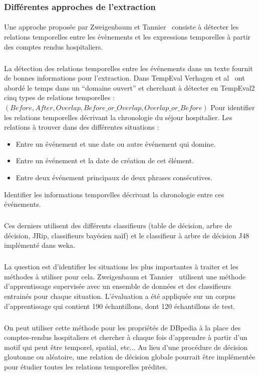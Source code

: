 \documentclass[12pt,a4]{report}
\begin{document}
\subsubsection{Différentes approches de l'extraction }
\paragraph{}
Une approche proposée par Zweigenbaum et Tannier~\cite{zweigenbaum2013} consiste à détecter les relations temporelles entre les évènements et les expressions temporelles à partir des comptes rendus hospitaliers.
\subparagraph{}
La détection des relations temporelles entre les événements dans un texte fournit de bonnes informations pour l’extraction.
\newline
Dans TempEval Verhagen et al~\cite{verhagen2010} ont abordé le temps dans un “domaine ouvert” et cherchant à détecter en TempEval2 cinq types de relations temporelles :
\newline
$(Before, After, Overlap, Before\_or\_Overlap, Overlap\_or\_Before)$
Pour identifier les relations temporelles décrivant la chronologie du séjour hospitalier.
\newline
Les relations à trouver dans des différentes situations :
\begin{itemize}
\item{}Entre un événement et une date ou autre événement qui domine.
\item{}Entre un événement et la date de création de cet élément.
\item{}Entre deux événement principaux de deux phrases consécutives.
\end{itemize}
Identifier les informations temporelles décrivant la chronologie entre ces événements.
\subparagraph{}
Ces derniers utilisent des différents classifieurs (table de décision, arbre de décision, JRip, classifieurs bayésien naïf) et le classifieur à arbre de décision J48 implémenté dans weka.
\subparagraph{}
La question est d’identifier les situations les plus importantes à traiter et les méthodes à utiliser pour cela.
Zweigenbaum et Tannier~\cite{zweigenbaum2013} utilisent une méthode d’apprentissage supervisée avec un ensemble de données et des classifieurs entrainés pour chaque situation.
L'évaluation a été appliquée sur un corpus d’apprentissage qui contient 190 échantillons, dont 120 échantillons de test.
\subparagraph{}
On peut utiliser cette méthode pour les propriétés de DBpedia à la place des comptes-rendus hospitaliers et chercher à chaque fois d'apprendre à partir d'un motif qui peut être temporel, spatial, etc...
Au lieu d’une procédure de décision gloutonne ou aléatoire, une relation de décision globale pourrait être implémentée pour étudier toutes les relations temporelles prédites.
\end{document}
